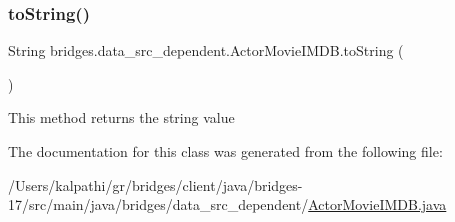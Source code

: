 \subsubsection{\texorpdfstring{to\+String()}{toString()}}
{\footnotesize\ttfamily String bridges.\+data\+\_\+src\+\_\+dependent.\+Actor\+Movie\+I\+M\+D\+B.\+to\+String (\begin{DoxyParamCaption}{ }\end{DoxyParamCaption})}

This method returns the string value 

The documentation for this class was generated from the following file\+:\begin{DoxyCompactItemize}
\item 
/\+Users/kalpathi/gr/bridges/client/java/bridges-\/17/src/main/java/bridges/data\+\_\+src\+\_\+dependent/\mbox{\hyperlink{_actor_movie_i_m_d_b_8java}{Actor\+Movie\+I\+M\+D\+B.\+java}}\end{DoxyCompactItemize}
